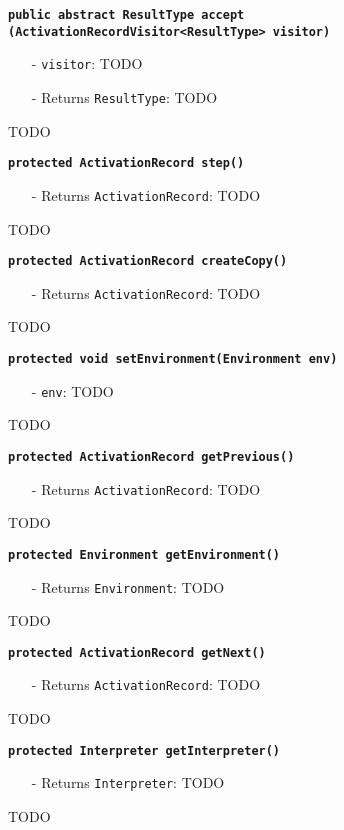 \documentclass[parskip=full,11pt,twoside]{scrartcl}
\begin{document}
\textbf{\texttt{public abstract ResultType accept\\(ActivationRecordVisitor<ResultType> visitor)}}
\begin{itemize}[noitemsep]
	\item[-] \texttt{visitor}: TODO
	\item[-] Returns \texttt{ResultType}: TODO
\end{itemize}
TODO

\textbf{\texttt{protected ActivationRecord step()}}
\begin{itemize}[noitemsep]
	\item[-] Returns \texttt{ActivationRecord}: TODO
\end{itemize}
TODO

\textbf{\texttt{protected ActivationRecord createCopy()}}
\begin{itemize}[noitemsep]
	\item[-] Returns \texttt{ActivationRecord}: TODO
\end{itemize}
TODO

\textbf{\texttt{protected void setEnvironment(Environment env)}}
\begin{itemize}[noitemsep]
	\item[-] \texttt{env}: TODO
\end{itemize}
TODO

\textbf{\texttt{protected ActivationRecord getPrevious()}}
\begin{itemize}[noitemsep]
	\item[-] Returns \texttt{ActivationRecord}: TODO
\end{itemize}
TODO

\textbf{\texttt{protected Environment getEnvironment()}}
\begin{itemize}[noitemsep]
	\item[-] Returns \texttt{Environment}: TODO
\end{itemize}
TODO

\textbf{\texttt{protected ActivationRecord getNext()}}
\begin{itemize}[noitemsep]
	\item[-] Returns \texttt{ActivationRecord}: TODO
\end{itemize}
TODO

\textbf{\texttt{protected Interpreter getInterpreter()}}
\begin{itemize}[noitemsep]
	\item[-] Returns \texttt{Interpreter}: TODO
\end{itemize}
TODO
\end{document}
